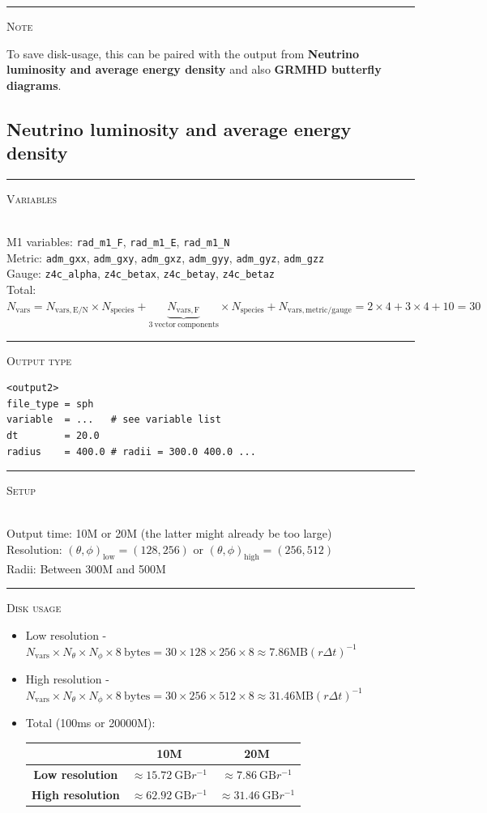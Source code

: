 \documentclass{article}
\newcommand{\var}[1]{%
  {\setlength{\fboxsep}{1.5pt}%
   \colorbox{varbg}{\textcolor{varfg}{\texttt{\small #1}}}}}
\newcommand{\step}[1]{%
  \par\medskip\noindent
  {\color{stepfg}\rule[-0.15ex]{2pt}{1.5ex}\hspace{0.5em}\scshape #1}%
  \hspace{0.75em}\ignorespaces}
\begin{document}
\step{Note}
To save disk-usage, this can be paired with the output from \textbf{Neutrino luminosity and average energy density} and also
\textbf{GRMHD butterfly diagrams}.

\subsection*{Neutrino luminosity and average energy density}
\step{Variables}\mbox{}\\
M1 variables: \var{rad\_m1\_F}, \var{rad\_m1\_E}, \var{rad\_m1\_N}\\
Metric: \var{adm\_gxx}, \var{adm\_gxy}, \var{adm\_gxz}, \var{adm\_gyy}, \var{adm\_gyz}, \var{adm\_gzz}\\
Gauge: \var{z4c\_alpha}, \var{z4c\_betax}, \var{z4c\_betay}, \var{z4c\_betaz}\\
Total: $\boxed{N_{\mathrm{vars}}}=N_{\mathrm{vars, E/N}}\times N_{\mathrm{species}}+\underbrace{N_{\mathrm{vars, F}}}_{3\ \mathrm{vector}\ \mathrm{components}}\times N_{\mathrm{species}}+N_{\mathrm{vars, metric/gauge}}=2\times4+3\times4+10=\boxed{30}$

\step{Output type}
\begin{verbatim}
<output2>
file_type = sph
variable  = ...   # see variable list
dt        = 20.0
radius    = 400.0 # radii = 300.0 400.0 ...
\end{verbatim}

\step{Setup}\mbox{}\\
Output time: 10M or 20M (the latter might already be too large)\\
Resolution: $(\theta,\phi)_{\mathrm{low}}=(128,256)$ or  $(\theta,\phi)_{\mathrm{high}}=(256,512)$\\
Radii: Between 300M and 500M

\step{Disk usage}
\begin{itemize}
  \item Low resolution - $N_{\mathrm{vars}}\times N_{\theta}\times N_{\phi}\times 8\ \mathrm{bytes}=30\times128\times256\times8\approx \boxed{7.86\mathrm{MB}(r\Delta t)^{-1}}$
  \item High resolution - $N_{\mathrm{vars}}\times N_{\theta}\times N_{\phi}\times 8\ \mathrm{bytes}=30\times256\times512\times8\approx \boxed{31.46\mathrm{MB}(r\Delta t)^{-1}}$
  \item Total (100ms or 20000M):
  \begin{raggedleft}
    \begin{tabular}{|c|c|c|}
      \hline
      &\textbf{10M}&\textbf{20M}\\
      \hline
      \textbf{Low resolution}&$\approx 15.72\ \mathrm{GB}r^{-1}$&$\approx 7.86\ \mathrm{GB}r^{-1}$\\
      \hline
      \textbf{High resolution}&$\approx 62.92\ \mathrm{GB}r^{-1}$&$\approx 31.46\ \mathrm{GB}r^{-1}$\\
      \hline
    \end{tabular}
  \end{raggedleft}
\end{itemize}
\end{document}
